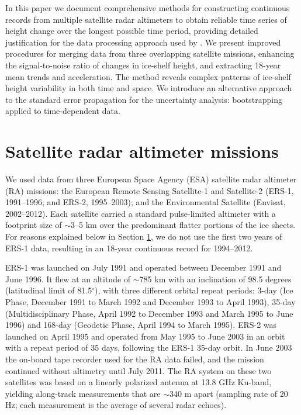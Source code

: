 In this paper we document comprehensive methods for constructing continuous records from multiple satellite radar altimeters to obtain reliable time series of height change over the longest possible time period, providing detailed justification for the data processing approach used by \textcite{Paolo2015}. We present improved procedures for merging data from three overlapping satellite missions, enhancing the signal-to-noise ratio of changes in ice-shelf height, and extracting 18-year mean trends and acceleration. The method reveals complex patterns of ice-shelf height variability in both time and space. We introduce an alternative approach to the standard error propagation for the uncertainty analysis: bootstrapping applied to time-dependent data. 

\section{Satellite radar altimeter missions}
\label{sat-ra}

\noindent
We used data from three European Space Agency (ESA) satellite radar altimeter (RA) missions: the European Remote Sensing Satellite-1 and Satellite-2 (ERS-1, 1991--1996; and ERS-2, 1995--2003); and the Environmental Satellite (Envisat, 2002--2012). Each satellite carried a standard pulse-limited altimeter with a footprint size of $\sim$3--5 km over the predominant flatter portions of the ice sheets. For reasons explained below in Section \ref{sat-ra}, we do not use the first two years of ERS-1 data, resulting in an 18-year continuous record for 1994--2012.

ERS-1 was launched on July 1991 and operated between December 1991 and June 1996. It flew at an altitude of $\sim$785 km with an inclination of 98.5 degrees (latitudinal limit of 81.5$^\circ$), with three different orbital repeat periods: 3-day (Ice Phase, December 1991 to March 1992 and December 1993 to April 1993), 35-day (Multidisciplinary Phase, April 1992 to December 1993 and March 1995 to June 1996) and 168-day (Geodetic Phase, April 1994 to March 1995). ERS-2 was launched on April 1995 and operated from May 1995 to June 2003 in an orbit with a repeat period of 35 days, following the ERS-1 35-day orbit. In June 2003 the on-board tape recorder used for the RA data failed, and the mission continued without altimetry until July 2011. The RA system on these two satellites was based on a linearly polarized antenna at 13.8 GHz Ku-band, yielding along-track measurements that are $\sim$340 m apart (sampling rate of 20 Hz; each measurement is the average of several radar echoes).


